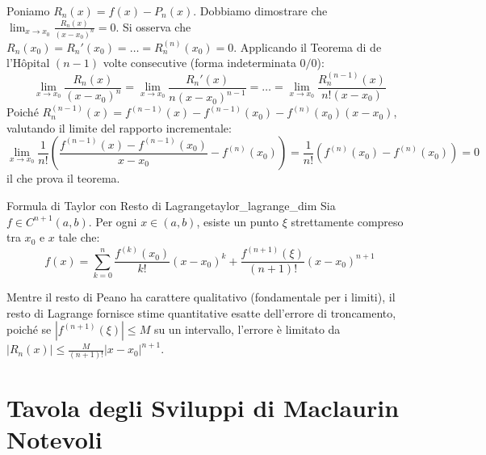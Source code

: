 \begin{dimostrazione}
Poniamo $R_n(x) = f(x) - P_n(x)$. Dobbiamo dimostrare che $\lim_{x \to x_0} \frac{R_n(x)}{(x - x_0)^n} = 0$.
Si osserva che $R_n(x_0) = R_n'(x_0) = \dots = R_n^{(n)}(x_0) = 0$.
Applicando il Teorema di de l'Hôpital $(n-1)$ volte consecutive (forma indeterminata $0/0$):
\[
    \lim_{x \to x_0} \frac{R_n(x)}{(x - x_0)^n} = \lim_{x \to x_0} \frac{R_n'(x)}{n(x - x_0)^{n-1}} = \dots = \lim_{x \to x_0} \frac{R_n^{(n-1)}(x)}{n! (x - x_0)}
\]
Poiché $R_n^{(n-1)}(x) = f^{(n-1)}(x) - f^{(n-1)}(x_0) - f^{(n)}(x_0)(x - x_0)$, valutando il limite del rapporto incrementale:
\[
    \lim_{x \to x_0} \frac{1}{n!} \left( \frac{f^{(n-1)}(x) - f^{(n-1)}(x_0)}{x - x_0} - f^{(n)}(x_0) \right) = \frac{1}{n!} \left( f^{(n)}(x_0) - f^{(n)}(x_0) \right) = 0
\]
il che prova il teorema.
\end{dimostrazione}

\begin{teorema}{Formula di Taylor con Resto di Lagrange}{taylor_lagrange_dim}
Sia $f \in C^{n+1}(a, b)$. Per ogni $x \in (a, b)$, esiste un punto $\xi$ strettamente compreso tra $x_0$ e $x$ tale che:
\[
    f(x) = \sum_{k=0}^n \frac{f^{(k)}(x_0)}{k!} (x - x_0)^k + \frac{f^{(n+1)}(\xi)}{(n+1)!} (x - x_0)^{n+1}
\]
\end{teorema}

\begin{osservazione}
Mentre il resto di Peano ha carattere qualitativo (fondamentale per i limiti), il resto di Lagrange fornisce stime quantitative esatte dell'errore di troncamento, poiché se $|f^{(n+1)}(\xi)| \le M$ su un intervallo, l'errore è limitato da $|R_n(x)| \le \frac{M}{(n+1)!}|x - x_0|^{n+1}$.
\end{osservazione}

\section{Tavola degli Sviluppi di Maclaurin Notevoli}
\label{sec:tavola_maclaurin_completa}

